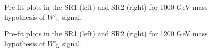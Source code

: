 \begin{figure}[H]
  \centering
  \caption{Pre-fit plots in the SR1 (left) and SR2 (right) for 1000 GeV mass hypothesis of $W'_{\text{L}}$ signal.}
  \label{fig:Prefit_WpLH1000_Asimov}
\end{figure}
\begin{figure}[H]
  \centering
  \caption{Pre-fit plots in the SR1 (left) and SR2 (right) for 1200 GeV mass hypothesis of $W'_{\text{L}}$ signal.}
  \label{fig:Prefit_WpLH1200_Asimov}
\end{figure}
